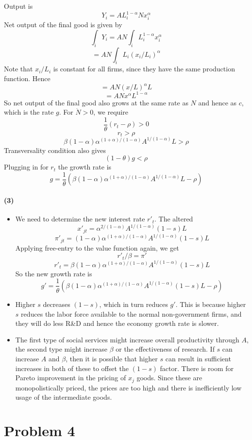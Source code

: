 \documentclass[10pt,letter]{article}
\newcommand{\problem}[1]{\section*{Problem #1}}
\newcommand{\problempart}[1]{\paragraph{#1}}
\begin{document}
Output is
\[ Y_i = AL_i^{1-\alpha} N x_i^\alpha \]
Net output of the final good is given by
\[ \int_i Y_i = AN \int_i L_i^{1-\alpha} x_i^\alpha \]
\[ = AN \int_i L_i (x_i/L_i)^\alpha \]
Note that $x_i/L_i$ is constant for all firms, since they have the same production function. Hence
\[ = AN \left(x/L\right)^\alpha L \]
\[ = AN x^\alpha L^{1-\alpha} \]
So net output of the final good also grows at the same rate as $N$ and hence as $c$, which is the rate $g$. For $\dot{N} > 0$, we require
\[ \frac{1}{\theta}(r_t-\rho) > 0\]
\[ r_t > \rho \]
\[ \beta(1-\alpha)\alpha^{(1+\alpha)/(1-\alpha)}A^{1/(1-\alpha)}L  > \rho \]
Transversality condition also gives
\[ (1-\theta)g < \rho \]
Plugging in for $r_t$ the growth rate is
\[ g = \frac{1}{\theta}\left(\beta(1-\alpha)\alpha^{(1+\alpha)/(1-\alpha)}A^{1/(1-\alpha)}L-\rho\right) \]
\problempart{(3)}
\begin{itemize}
  \item We need to determine the new interest rate $r'_t$. The altered
  \[ x'_{jt} = \alpha^{2/(1-\alpha)}A^{1/(1-\alpha)}(1-s)L \]
  \[ \pi'_{jt} = (1-\alpha)\alpha^{(1+\alpha)/(1-\alpha)}A^{1/(1-\alpha)}(1-s)L \]
  Applying free-entry to the value function again, we get
  \[ r'_t/\beta = \pi'  \]
  \[ r'_t = \beta (1-\alpha)\alpha^{(1+\alpha)/(1-\alpha)}A^{1/(1-\alpha)}(1-s)L \]
  So the new growth rate is
  \[ g' = \frac{1}{\theta}\left(  \beta (1-\alpha)\alpha^{(1+\alpha)/(1-\alpha)}A^{1/(1-\alpha)}(1-s)L  - \rho \right) \]

  \item Higher $s$ decreases $(1-s)$, which in turn reduces $g'$. This is because higher $s$ reduces the labor force available to the normal non-government firms, and they will do less R\&D and hence the economy growth rate is slower.
  \item The first type of social services might increase overall productivity through $A$, the second type might increase $\beta$ or the effectiveness of research. If $s$ can increase $A$ and $\beta$, then it is possible that higher $s$ can result in sufficient increases in both of these to offset the $(1-s)$ factor. There is room for Pareto improvement in the pricing of $x_j$ goods. Since these are monopolistically priced, the prices are too high and there is inefficiently low usage of the intermediate goods.
\end{itemize}
\pagebreak
\problem{4}
\end{document}
